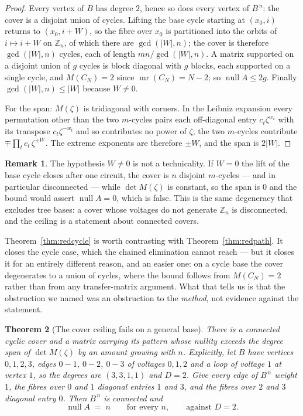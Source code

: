 \documentclass[11pt]{article}
\newtheorem{theorem}{Theorem}
\theoremstyle{definition}
\newtheorem{remark}[theorem]{Remark}
\begin{document}
\begin{proof}
Every vertex of $B$ has degree $2$, hence so does every vertex of $B^{\,n}$: the
cover is a disjoint union of cycles. Lifting the base cycle starting at
$(x_0,i)$ returns to $(x_0,i+W)$, so the fibre over $x_0$ is partitioned into
the orbits of $i\mapsto i+W$ on $\mathbb Z_n$, of which there are $\gcd(|W|,n)$;
the cover is therefore $\gcd(|W|,n)$ cycles, each of length $mn/\gcd(|W|,n)$.
A matrix supported on a disjoint union of $g$ cycles is block diagonal with $g$
blocks, each supported on a single cycle, and $M(C_N)=2$ since
$\operatorname{mr}(C_N)=N-2$; so $\operatorname{null}A\le2g$. Finally
$\gcd(|W|,n)\le|W|$ because $W\ne0$.

For the span: $M(\zeta)$ is tridiagonal with corners. In the Leibniz expansion
every permutation other than the two $m$-cycles pairs each off-diagonal entry
$c_t\zeta^{w_t}$ with its transpose $c_t\zeta^{-w_t}$ and so contributes no
power of $\zeta$; the two $m$-cycles contribute $\mp\prod_tc_t\,\zeta^{\pm W}$.
The extreme exponents are therefore $\pm W$, and the span is $2|W|$.
\end{proof}

\begin{remark}
The hypothesis $W\ne0$ is not a technicality. If $W=0$ the lift of the base
cycle closes after one circuit, the cover is $n$ disjoint $m$-cycles --- and in
particular disconnected --- while $\det M(\zeta)$ is constant, so the span is
$0$ and the bound would assert $\operatorname{null}A=0$, which is false. This is
the same degeneracy that excludes tree bases: a cover whose voltages do not
generate $\mathbb Z_n$ is disconnected, and the ceiling is a statement about
connected covers.
\end{remark}

\noindent
Theorem~\ref{thm:redcycle} is worth contrasting with
Theorem~\ref{thm:redpath}. It closes the cycle case, which the chained
elimination cannot reach --- but it closes it for an entirely different reason,
and an easier one: on a cycle base the cover degenerates to a union of cycles,
where the bound follows from $M(C_N)=2$ rather than from any transfer-matrix
argument. What that tells us is that the obstruction we named was an obstruction
to the \emph{method}, not evidence against the statement.

\begin{theorem}[The cover ceiling fails on a general base]\label{thm:cexcover}
There is a connected cyclic cover and a matrix carrying its pattern whose
nullity exceeds the degree span of $\det M(\zeta)$ by an amount growing with
$n$. Explicitly, let $B$ have vertices $0,1,2,3$, edges $0\!-\!1$, $0\!-\!2$,
$0\!-\!3$ of voltages $0,1,2$ and a loop of voltage $1$ at vertex $1$, so the
degrees are $(3,3,1,1)$ and $D=2$. Give every edge of $B^{\,n}$ weight $1$, the
fibres over $0$ and $1$ diagonal entries $1$ and $3$, and the fibres over $2$
and $3$ diagonal entry $0$. Then $B^{\,n}$ is connected and
\[
  \operatorname{null}A \;=\; n \qquad\text{for every }n, \qquad\text{against } D=2 .
\]
\end{theorem}
\end{document}
